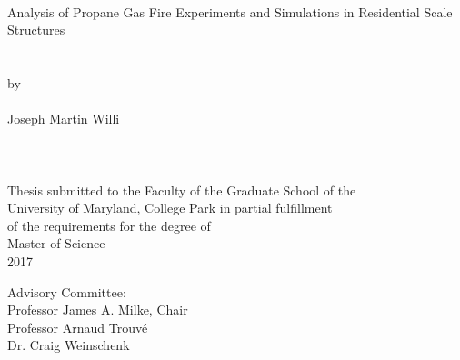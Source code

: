 
\thispagestyle{empty}
\hbox{\ }
\vspace{1in}
\renewcommand{\baselinestretch}{1}
\small\normalsize
\begin{center}

\large{{Analysis of Propane Gas Fire Experiments and Simulations in Residential Scale Structures}}\\
\ \\
\ \\
\large{by} \\
\ \\
\large{Joseph Martin Willi}%
\ \\
\ \\
\ \\
\ \\
\normalsize
Thesis submitted to the Faculty of the Graduate School of the \\
University of Maryland, College Park in partial fulfillment \\
of the requirements for the degree of \\
Master of Science \\
2017
\end{center}

\vspace{7.5em}

\noindent Advisory Committee: \\
Professor James A. Milke, Chair \\
Professor Arnaud Trouv\'e \\
Dr. Craig Weinschenk
